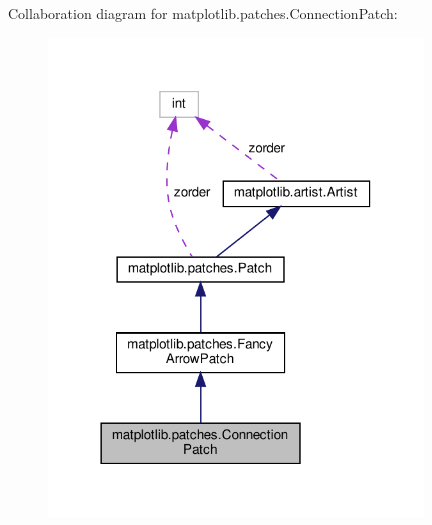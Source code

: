Collaboration diagram for matplotlib.\+patches.\+Connection\+Patch\+:
\nopagebreak
\begin{figure}[H]
\begin{center}
\leavevmode
\includegraphics[width=282pt]{classmatplotlib_1_1patches_1_1ConnectionPatch__coll__graph}
\end{center}
\end{figure}
